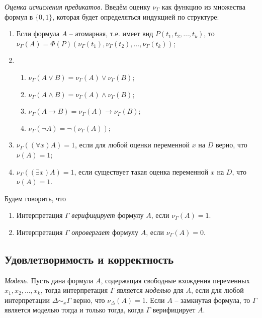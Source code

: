 \begin{definition}
  \emph{Оценка исчисления предикатов.} Введём оценку $\nu_{\Gamma}$ как функцию из множества формул в $\{0, 1\}$, которая будет определяться индукцией по структуре:
  \begin{enumerate}
  	\item Если формула $A$ -- атомарная, т.е. имеет вид $P(t_1, t_2, \ldots, t_k)$, то $\nu_{\Gamma}(A) = \Phi(P)(\nu_{\Gamma}(t_1), \nu_{\Gamma}(t_2), \ldots, \nu_{\Gamma}(t_k))$;
  	\item \begin{enumerate}
    		\item $\nu_\Gamma(A \vee B) = \nu_\Gamma(A) \vee \nu_\Gamma(B)$;
    		\item $\nu_\Gamma(A \wedge B) = \nu_\Gamma(A) \wedge \nu_\Gamma(B)$;
    		\item $\nu_\Gamma(A \rightarrow B) = \nu_\Gamma(A) \rightarrow \nu_\Gamma(B)$;
    		\item $\nu_\Gamma(\neg A) = \neg(\nu_\Gamma(A))$;
    	  \end{enumerate}
    \item $\nu_\Gamma((\forall x)A) = 1$, если для любой оценки переменной $x$ на $D$ верно, что $\nu(A) = 1$;
    
    \item $\nu_\Gamma((\exists x)A) = 1$, если существует такая оценка переменной $x$ на $D$, что $\nu(A) = 1$.
  \end{enumerate}
\end{definition}

Будем говорить, что 
\begin{enumerate}
	\item Интерпретация $\Gamma$ \textit{верифицирует} формулу $A$, если $\nu_{\Gamma}(A) = 1$.
	\item Интерпретация $\Gamma$ \textit{опровергает} формулу $A$, если $\nu_{\Gamma}(A) = 0$.
\end{enumerate}

\subsection{Удовлетворимость и корректность}

\begin{definition}
  \emph{Модель.} Пусть дана формула $A$, содержащая свободные вхождения переменных $x_1, x_2, \ldots, x_k$, тогда интерпретация $\Gamma$ является \textit{моделью} для $A$, если для любой интерпретации $\Delta \sim_x \Gamma$ верно, что $\nu_{\Delta}(A) = 1$. Если $A$ -- замкнутая формула, то $\Gamma$ является моделью тогда и только тогда, когда $\Gamma$ верифицирует $A$.
\end{definition}

